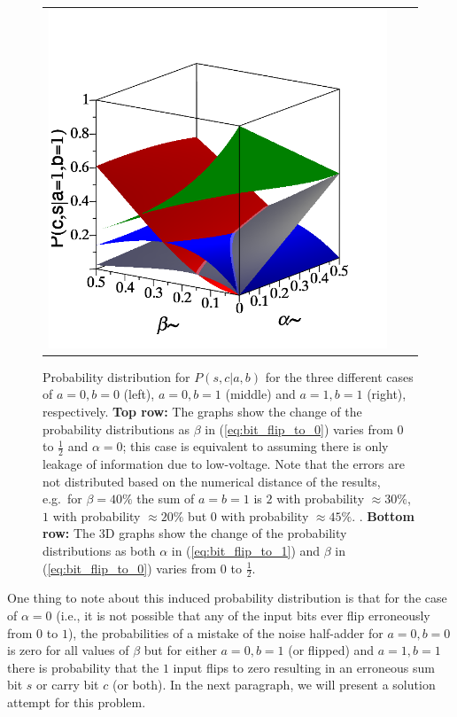 \begin{figure}
\begin{tabular}{ccc}
        \includegraphics[width=.3\textwidth]{media/noisy_half_adder_value_full_dist_11.png} \\        
    \end{tabular}
    \caption{Probability distribution for $P(s,c|a,b)$ for the three different cases of $a=0, b=0$ (left), $a=0, b=1$ (middle) and $a=1, b=1$ (right), respectively. {\bf Top row:} The graphs show the change of the probability distributions as $\beta$ in (\ref{eq:bit_flip_to_0}) varies from $0$ to $\frac{1}{2}$ and $\alpha = 0$; this case is equivalent to assuming there is only leakage of information due to low-voltage. Note that the errors are not distributed based on the numerical distance of the results, e.g.\ for $\beta=40\%$ the sum of $a=b=1$ is $2$ with probability $\approx 30\%$, $1$ with probability $\approx 20\%$ but $0$ with probability $\approx 45\%$. \label{fig:noise_prob_dist}. {\bf Bottom row:} The 3D graphs show the change of the probability distributions as both $\alpha$ in (\ref{eq:bit_flip_to_1}) and $\beta$ in (\ref{eq:bit_flip_to_0}) varies from $0$ to $\frac{1}{2}$.}
\end{figure}
One thing to note about this induced probability distribution is that for the case of $\alpha=0$ (i.e., it is not possible that any of the input bits ever flip erroneously from $0$ to $1$), the probabilities of a mistake of the noise half-adder for $a=0, b=0$ is zero for all values of $\beta$ but for either $a=0, b=1$ (or flipped) and $a=1, b=1$ there is probability that the $1$ input flips to zero resulting in an erroneous sum bit $s$ or carry bit $c$ (or both). In the next paragraph, we will present a solution attempt for this problem.

